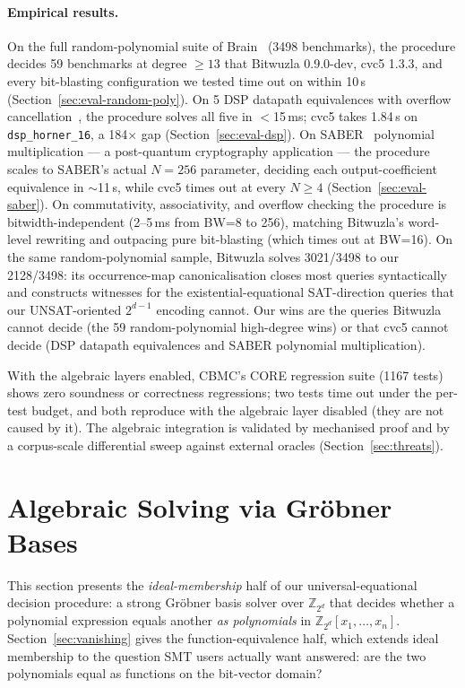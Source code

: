 \documentclass[runningheads]{llncs}
\newcommand{\cbmc}{\textsc{CBMC}\xspace}
\begin{document}
\paragraph{Empirical results.}
On the full random-polynomial suite of
Brain~\cite{brain2025subpoly} (3498 benchmarks), the procedure decides 59
benchmarks at degree $\geq 13$ that Bitwuzla 0.9.0-dev,
cvc5 1.3.3, and every bit-blasting configuration we tested time
out on within 10\,s (Section~\ref{sec:eval-random-poly}). On 5
DSP datapath equivalences with overflow
cancellation~\cite{shekhar2007equivalence}, the procedure solves
all five in $<$15\,ms; cvc5 takes 1.84\,s on
\texttt{dsp\_horner\_16}, a 184$\times$ gap
(Section~\ref{sec:eval-dsp}). On
SABER~\cite{daemen2018saber} polynomial multiplication ---
a post-quantum cryptography application --- the procedure
scales to SABER's actual $N = 256$ parameter, deciding each
output-coefficient equivalence in $\sim$11\,s, while cvc5
times out at every $N \geq 4$
(Section~\ref{sec:eval-saber}). On commutativity, associativity,
and overflow checking the procedure is bitwidth-independent
(2--5\,ms from BW=8 to 256), matching Bitwuzla's word-level
rewriting and outpacing pure bit-blasting (which times out at
BW=16). On the same random-polynomial sample, Bitwuzla
solves 3021/3498 to our 2128/3498: its
occurrence-map canonicalisation closes most queries
syntactically and constructs witnesses for the
existential-equational SAT-direction queries that our
UNSAT-oriented $2^{d-1}$ encoding cannot. Our wins are the
queries Bitwuzla cannot decide (the 59 random-polynomial
high-degree wins) or that cvc5 cannot decide (DSP datapath
equivalences and SABER polynomial multiplication).

With the algebraic layers enabled, \cbmc's CORE regression suite
(1167 tests) shows zero soundness or correctness regressions; two
tests time out under the per-test budget, and both reproduce with
the algebraic layer disabled (they are not caused by it). The
algebraic integration is validated by mechanised proof and by a
corpus-scale differential sweep against external oracles
(Section~\ref{sec:threats}).

\section{Algebraic Solving via Gr\"obner Bases}
\label{sec:algebraic}

This section presents the \emph{ideal-membership} half of our
universal-equational decision procedure: a strong Gr\"obner basis
solver over $\mathbb{Z}_{2^d}$ that decides whether a polynomial
expression equals another \emph{as polynomials} in
$\mathbb{Z}_{2^d}[x_1, \ldots, x_n]$. Section~\ref{sec:vanishing}
gives the function-equivalence half, which extends ideal membership
to the question SMT users actually want answered: are the two
polynomials equal as functions on the bit-vector domain?
\end{document}
